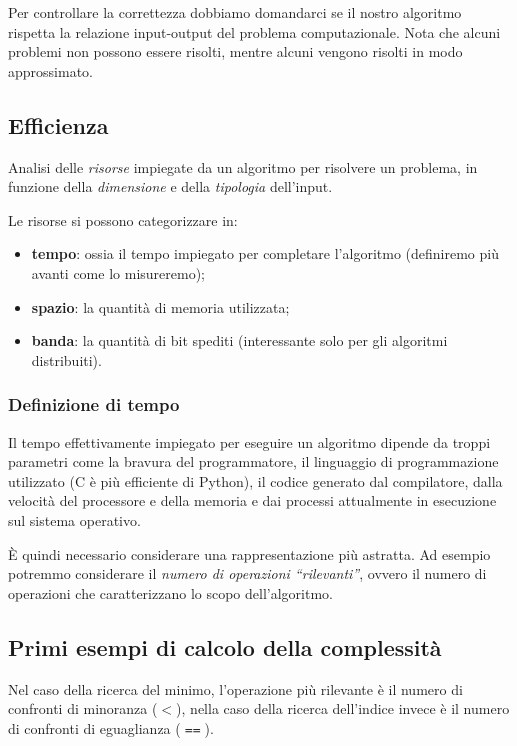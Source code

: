 Per controllare la correttezza dobbiamo domandarci se il nostro algoritmo rispetta la relazione input-output del problema computazionale.
Nota che alcuni problemi non possono essere risolti, mentre alcuni vengono risolti in modo approssimato.

\subsection{Efficienza}

\begin{definition*}
Analisi delle \emph{risorse} impiegate da un algoritmo per risolvere un problema, in funzione della \emph{dimensione} e della \emph{tipologia} dell'input.
\end{definition*}
Le risorse si possono categorizzare in:
\begin{itemize}
    \item \textbf{tempo}: ossia il tempo impiegato per completare l'algoritmo (definiremo più avanti come lo misureremo);
    \item \textbf{spazio}: la quantità di memoria utilizzata;
    \item \textbf{banda}: la quantità di bit spediti (interessante solo per gli algoritmi distribuiti).
\end{itemize}

\subsubsection{Definizione di tempo}

Il tempo effettivamente impiegato per eseguire un algoritmo dipende da troppi parametri come la bravura del programmatore, il linguaggio di programmazione utilizzato (C è più efficiente di Python), il codice generato dal compilatore, dalla velocità del processore e della memoria e dai processi attualmente in esecuzione sul sistema operativo.

\`E quindi necessario considerare una rappresentazione più astratta.
Ad esempio potremmo considerare il \emph{numero di operazioni \enquote{rilevanti}}, ovvero il numero di operazioni che caratterizzano lo scopo dell'algoritmo.

\subsection{Primi esempi di calcolo della complessità}

Nel caso della ricerca del minimo, l'operazione più rilevante è il numero di confronti di minoranza (\(<\)), nella caso della ricerca dell'indice invece è il numero di confronti di eguaglianza (\(\Equal\)).

